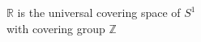 \documentclass[preview]{standalone}
\begin{document}
\begin{center}
$\mathbb{R}$ is the universal covering space of $S^1$\\with covering group $\mathbb{Z}$
\end{center}
\end{document}
